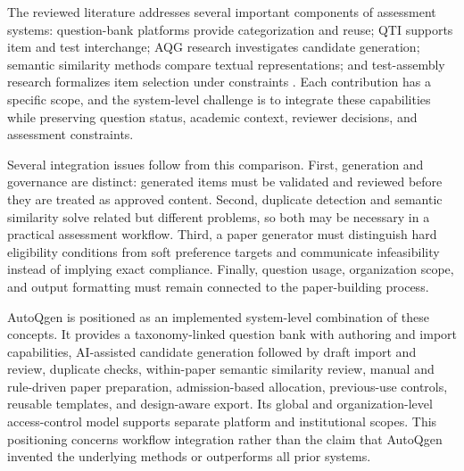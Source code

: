 The reviewed literature addresses several important components of assessment systems: question-bank platforms provide categorization and reuse; QTI supports item and test interchange; AQG research investigates candidate generation; semantic similarity methods compare textual representations; and test-assembly research formalizes item selection under constraints \cite{moodleQuestionBank,imsQti3,kurdi2020,reimers2019sbert,vanDerLinden2005}. Each contribution has a specific scope, and the system-level challenge is to integrate these capabilities while preserving question status, academic context, reviewer decisions, and assessment constraints.

Several integration issues follow from this comparison. First, generation and governance are distinct: generated items must be validated and reviewed before they are treated as approved content. Second, duplicate detection and semantic similarity solve related but different problems, so both may be necessary in a practical assessment workflow. Third, a paper generator must distinguish hard eligibility conditions from soft preference targets and communicate infeasibility instead of implying exact compliance. Finally, question usage, organization scope, and output formatting must remain connected to the paper-building process.

AutoQgen is positioned as an implemented system-level combination of these concepts. It provides a taxonomy-linked question bank with authoring and import capabilities, AI-assisted candidate generation followed by draft import and review, duplicate checks, within-paper semantic similarity review, manual and rule-driven paper preparation, admission-based allocation, previous-use controls, reusable templates, and design-aware export. Its global and organization-level access-control model supports separate platform and institutional scopes. This positioning concerns workflow integration rather than the claim that AutoQgen invented the underlying methods or outperforms all prior systems.

